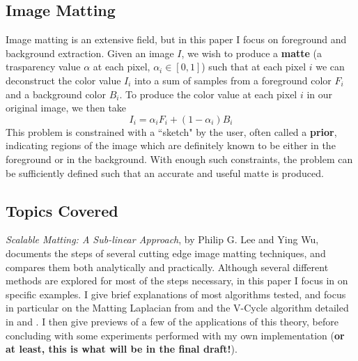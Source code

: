 \subsection{Image Matting}
Image matting is an extensive field, but in this paper I focus on foreground and background extraction. Given an image $I$, we wish to produce a \textbf{matte} (a trasparency value $\alpha$ at each pixel, $\alpha_{i}\in[0,1]$) such that at each pixel $i$ we can deconstruct the color value $I_{i}$ into a sum of samples from a foreground color $F_{i}$ and a background color $B_{i}$. To produce the color value at each pixel $i$ in our original image, we then take
\[I_{i}=\alpha_{i}F_{i}+(1-\alpha_{i})B_{i}\]
This problem is constrained with a ``sketch" by the user, often called a \textbf{prior}, indicating regions of the image which are definitely known to be either in the foreground or in the background. With enough such constraints, the problem can be sufficiently defined such that an accurate and useful matte is produced.
\subsection{Topics Covered}
\textit{Scalable Matting: A Sub-linear Approach}, by Philip G. Lee and Ying Wu, documents the steps of several cutting edge image matting techniques, and compares them both analytically and practically. Although several different methods are explored for most of the steps necessary, in this paper I focus in on specific examples. I give brief explanations of most algorithms tested, and focus in particular on the Matting Laplacian from \cite{levin08} and the V-Cycle algorithm detailed in \cite{briggs87} and \cite{bramble93}. I then give previews of a few of the applications of this theory, before concluding with some experiments performed with my own implementation (\textbf{or at least, this is what will be in the final draft!}).